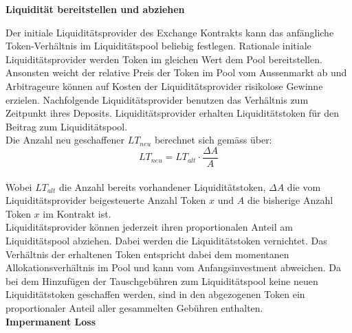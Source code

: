 \documentclass[12pt,a4paper,titlepage,oneside,english]{article}
\begin{document}
\textbf{Liquidität bereitstellen und abziehen}

Der initiale Liquiditätsprovider des Exchange Kontrakts kann das anfängliche Token-Verhältnis im Liquiditätspool beliebig festlegen.  Rationale initiale Liquiditätsprovider werden Token im gleichen Wert dem Pool bereitstellen. Ansonsten weicht der relative Preis der Token im Pool vom Aussenmarkt ab und Arbitrageure können auf Kosten der Liquiditätsprovider risikolose Gewinne erzielen. Nachfolgende Liquiditätsprovider benutzen das Verhältnis zum Zeitpunkt ihres Deposits. Liquiditätsprovider erhalten Liquiditätstoken für den Beitrag zum Liquiditätspool. \citep[vgl.][]{Adams2020} \\ Die Anzahl neu geschaffener $ LT_{neu}$ berechnet sich gemäss \citet{Adams2020} über:  
\begin{equation}
LT_{neu} = LT_{alt} \cdot \dfrac{\Delta A }{A} \label{eq:7}
\end{equation}\\
Wobei $LT_{alt}$ die Anzahl bereits vorhandener Liquiditätstoken, $\Delta A$ die vom Liquiditätsprovider beigesteuerte Anzahl Token $x$ und $A$ die bisherige Anzahl Token $x$ im Kontrakt ist.\\
Liquiditätsprovider können jederzeit ihren proportionalen Anteil am Liquiditätspool abziehen. Dabei werden die Liquiditätstoken \glqq vernichtet\grqq . Das Verhältnis der erhaltenen Token entspricht dabei dem momentanen Allokationsverhältnis im Pool und kann vom Anfangsinvestment abweichen. Da bei dem Hinzufügen der Tauschgebühren zum Liquiditätspool keine neuen Liquiditätstoken geschaffen werden, sind in den abgezogenen Token ein proportionaler Anteil aller gesammelten Gebühren enthalten. \citep[vgl.][]{Adams2020} \\

\textbf{Impermanent Loss}
\end{document}
